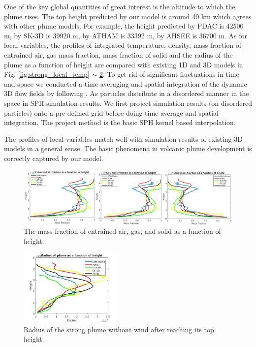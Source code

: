 \documentclass[journal abbreviation, manuscript]{copernicus}
\begin{document}
One of the key global quantities of great interest is the altitude to which the plume rises. The top height predicted by our model is around 40 km which agrees with other plume models. For example, the height predicted by PDAC is 42500 m, by SK-3D is 39920 m, by ATHAM is 33392 m, by AHSEE is 36700 m. As for local variables, the profiles of integrated temperature, density, mass fraction of entrained air, gas mass fraction, mass fraction of solid and the radius of the plume as a function of height are compared with existing 1D and 3D models in Fig. \ref{fig:strong_local_temp} $\sim$ \ref{fig:strong_local_radius}. To get rid of significant fluctuations in time and space we conducted a time averaging and spatial integration of the dynamic 3D flow fields by following \citet {cerminara2016large}.
As particles distribute in a disordered manner in the space in SPH simulation results. We first project simulation results (on disordered particles) onto a pre-defined grid before doing time average and spatial integration. The project method is the basic SPH kernel based interpolation.

The profiles of local variables match well with simulation results of existing 3D models in a general sense. The basic phenomena in volcanic plume development is correctly captured by our model.

\begin{figure}
\includegraphics[width=15cm]{msfrac}
\caption{The mass fraction of entrained air, gas, and solid as a function of height.}
\label{fig:strong_plume_mass_fraction}
\end{figure}
%

\begin{figure}
\center
\includegraphics[width=5cm]{radius_strong}
\caption{Radius of the strong plume without wind after reaching its top height.}
\label{fig:strong_local_radius}
\end{figure}
\end{document}
